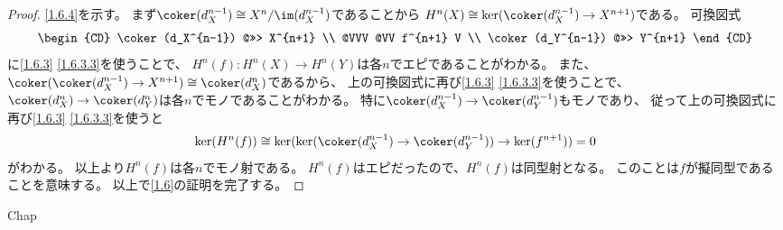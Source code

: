 \documentclass[uplatex,dvipdfmx]{jsarticle}
\begin{document}
\begin{proof}
  \ref{1.6.4}を示す。
  まず\(\coker(d_X^{n-1})\cong X^n/\im(d_X^{n-1})\)であることから
  \(H^n(X) \cong \ker(\coker(d_X^{n-1})\to X^{n+1})\)である。
  可換図式
  \[
  \begin{CD}
    \coker(d_X^{n-1}) @>>> X^{n+1} \\
    @VVV @VV f^{n+1} V \\
    \coker(d_Y^{n-1}) @>>> Y^{n+1}
  \end{CD}
  \]
  に\ref{1.6.3} \ref{1.6.3.3}を使うことで、
  \(H^n(f):H^n(X)\to H^n(Y)\)は各\(n\)でエピであることがわかる。
  また、\(\coker(\coker(d_X^{n-1})\to X^{n+1}) \cong \coker(d_X^n)\)であるから、
  上の可換図式に再び\ref{1.6.3} \ref{1.6.3.3}を使うことで、
  \(\coker(d_X^n)\to \coker(d_Y^n)\)は各\(n\)でモノであることがわかる。
  特に\(\coker(d_X^{n-1})\to \coker(d_Y^{n-1})\)もモノであり、
  従って上の可換図式に再び\ref{1.6.3} \ref{1.6.3.3}を使うと
  \[
  \ker(H^n(f)) \cong
  \ker(\ker(\coker(d_X^{n-1})\to \coker(d_Y^{n-1})) \to \ker(f^{n+1})) = 0
  \]
  がわかる。
  以上より\(H^n(f)\)は各\(n\)でモノ射である。
  \(H^n(f)\)はエピだったので、\(H^n(f)\)は同型射となる。
  このことは\(f\)が擬同型であることを意味する。
  以上で\autoref{1.6}の証明を完了する。
\end{proof}



\ifcsname Chap\endcsname\else
\printbibliography
\end{document}
